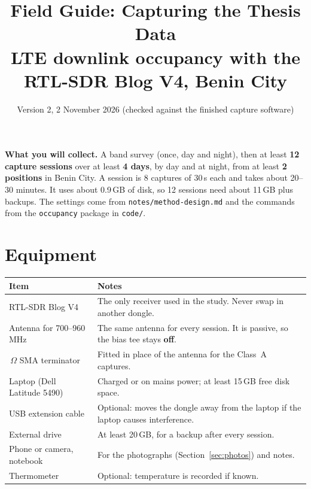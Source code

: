 \documentclass[11pt,a4paper]{article}
\title{\textbf{Field Guide: Capturing the Thesis Data}\\[2pt]\large LTE downlink occupancy with the RTL-SDR Blog V4, Benin City}
\author{Version 2, 2 November 2026 (checked against the finished capture software)}
\date{}
\newcommand{\cmd}[1]{\texttt{#1}}
\newcommand{\notebox}[1]{\par\smallskip\noindent\colorbox{boxgrey}{\begin{minipage}{\dimexpr\linewidth-2\fboxsep\relax}#1\end{minipage}}\par\smallskip}
\begin{document}
\maketitle
\vspace{-8mm}

\notebox{%
\textbf{What you will collect.} A band survey (once, day and night), then at least \textbf{12 capture sessions} over at least \textbf{4 days}, by day and at night, from at least \textbf{2 positions} in Benin City. A session is 8 captures of 30\,s each and takes about 20--30 minutes. It uses about 0.9\,GB of disk, so 12 sessions need about 11\,GB plus backups. The settings come from \cmd{notes/method-design.md} and the commands from the \cmd{occupancy} package in \cmd{code/}.
}

\section{Equipment}
\begin{tabularx}{\linewidth}{@{} >{\raggedright\arraybackslash}p{4.2cm} X @{}}
\toprule
Item & Notes \\
\midrule
RTL-SDR Blog V4 & The only receiver used in the study. Never swap in another dongle. \\
Antenna for 700--960\,MHz & The same antenna for every session. It is passive, so the bias tee stays \textbf{off}. \\
50\,$\Omega$ SMA terminator & Fitted in place of the antenna for the Class~A captures. \\
Laptop (Dell Latitude 5490) & Charged or on mains power; at least 15\,GB free disk space. \\
USB extension cable & Optional: moves the dongle away from the laptop if the laptop causes interference. \\
External drive & At least 20\,GB, for a backup after every session. \\
Phone or camera, notebook & For the photographs (Section~\ref{sec:photos}) and notes. \\
Thermometer & Optional: temperature is recorded if known. \\
\bottomrule
\end{tabularx}
\end{document}
